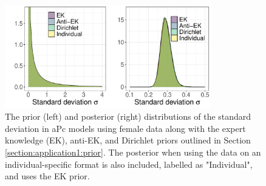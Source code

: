 \begin{figure}[h!]
    \centering
    \includegraphics[width=0.8\textwidth]{Figures/compare_plots_indi_s0_f.pdf}
    \caption{The prior (left) and posterior (right) distributions of the standard deviation in aPc models using female data along with the expert knowledge (EK), anti-EK, and Dirichlet priors outlined in Section \ref{section:application1:prior}. The posterior when using the data on an individual-specific format is also included, labelled as "Individual", and uses the EK prior.}
    \label{figure:INDI:s0_f}
\end{figure}


